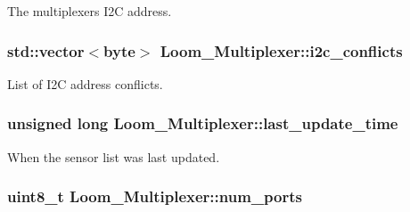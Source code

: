 The multiplexer\textquotesingle{}s I2C address. 

\subsubsection[{\texorpdfstring{i2c\+\_\+conflicts}{i2c_conflicts}}]{\setlength{\rightskip}{0pt plus 5cm}std\+::vector$<$byte$>$ Loom\+\_\+\+Multiplexer\+::i2c\+\_\+conflicts\hspace{0.3cm}{\ttfamily [protected]}}\hypertarget{class_loom___multiplexer_ab30823612eef6bb3fcd2fc023bc425b3}{}\label{class_loom___multiplexer_ab30823612eef6bb3fcd2fc023bc425b3}


List of I2C address conflicts. 

\subsubsection[{\texorpdfstring{last\+\_\+update\+\_\+time}{last_update_time}}]{\setlength{\rightskip}{0pt plus 5cm}unsigned long Loom\+\_\+\+Multiplexer\+::last\+\_\+update\+\_\+time\hspace{0.3cm}{\ttfamily [protected]}}\hypertarget{class_loom___multiplexer_a2e924abfa8444f66dc1b9cdf3a3aad47}{}\label{class_loom___multiplexer_a2e924abfa8444f66dc1b9cdf3a3aad47}


When the sensor list was last updated. 

\subsubsection[{\texorpdfstring{num\+\_\+ports}{num_ports}}]{\setlength{\rightskip}{0pt plus 5cm}uint8\+\_\+t Loom\+\_\+\+Multiplexer\+::num\+\_\+ports\hspace{0.3cm}{\ttfamily [protected]}}\hypertarget{class_loom___multiplexer_a444e58e98dd2ef120e2bb5a2e6befc45}{}\label{class_loom___multiplexer_a444e58e98dd2ef120e2bb5a2e6befc45}


